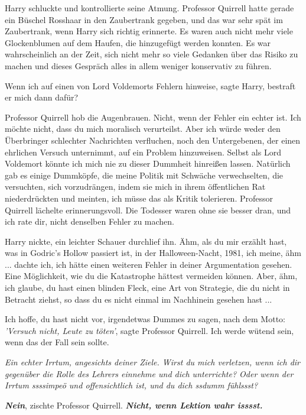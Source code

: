 Harry schluckte und kontrollierte seine Atmung. Professor Quirrell hatte gerade
ein Büschel Rosshaar in den Zaubertrank gegeben, und das war sehr spät im
Zaubertrank, wenn Harry sich richtig erinnerte. Es waren auch nicht mehr viele
Glockenblumen auf dem Haufen, die hinzugefügt werden konnten. Es war
wahrscheinlich an der Zeit, sich nicht mehr so viele Gedanken über das Risiko zu
machen und dieses Gespräch alles in allem weniger konservativ zu führen.

\glqq{}Wenn ich auf einen von Lord Voldemorts Fehlern hinweise\grqq{}, sagte
Harry, \glqq{}bestraft er mich dann dafür?\grqq{}

Professor Quirrell hob die Augenbrauen. \glqq{}Nicht, wenn der Fehler ein echter
ist. Ich möchte nicht, dass du mich moralisch verurteilst. Aber ich würde weder
den Überbringer schlechter Nachrichten verfluchen, noch den Untergebenen, der
einen ehrlichen Versuch unternimmt, auf ein Problem hinzuweisen. Selbst als Lord
Voldemort könnte ich mich nie zu dieser Dummheit hinreißen lassen. Natürlich gab
es einige Dummköpfe, die meine Politik mit Schwäche verwechselten, die
versuchten, sich vorzudrängen, indem sie mich in ihrem öffentlichen Rat
niederdrückten und meinten, ich müsse das als Kritik tolerieren.\grqq{} Professor
Quirrell lächelte erinnerungsvoll. \glqq{}Die Todesser waren ohne sie besser
dran, und ich rate dir, nicht denselben Fehler zu machen.\grqq{}

Harry nickte, ein leichter Schauer durchlief ihn. \glqq{}Ähm, als du mir erzählt
hast, was in Godric's Hollow passiert ist, in der Halloween-Nacht, 1981, ich
meine, ähm ... dachte ich, ich hätte einen weiteren Fehler in deiner
Argumentation gesehen. Eine Möglichkeit, wie du die Katastrophe hättest
vermeiden können. Aber, ähm, ich glaube, du hast einen blinden Fleck, eine Art
von Strategie, die du nicht in Betracht ziehst, so dass du es nicht einmal im
Nachhinein gesehen hast ...\grqq{}

\glqq{}Ich hoffe, du hast nicht vor, irgendetwas Dummes zu sagen, nach dem Motto:
\emph{'Versuch nicht, Leute zu töten'}\grqq{}, sagte Professor Quirrell. \glqq{}
Ich werde wütend sein, wenn das der Fall sein sollte.\grqq{}

\glqq{}\emph{Ein echter Irrtum, angesichts deiner Ziele. Wirst du mich verletzen,
wenn ich dir gegenüber die Rolle des Lehrers einnehme und dich unterrichte? Oder
wenn der Irrtum ssssimpeö und offensichtlich ist, und du dich ssdumm fühlssst?}\grqq{}

\glqq{}\textbf{\emph{Nein}}\grqq{}, zischte Professor Quirrell. \glqq{}
\textbf{\emph{Nicht, wenn Lektion wahr isssst.}}\grqq{}

